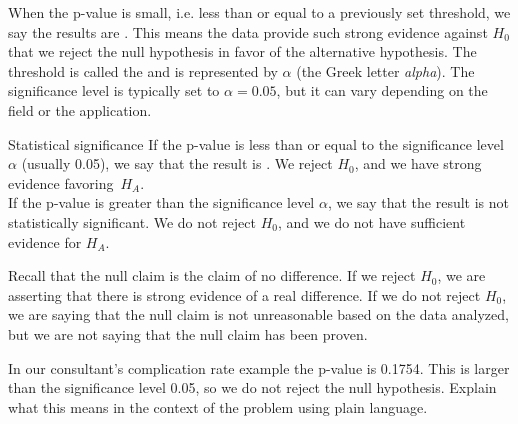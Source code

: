 When the p-value is small, i.e. less than or equal to a previously set threshold, we say the results are . This means the data provide such strong evidence against $H_0$ that we reject the null hypothesis in favor of the alternative hypothesis. The threshold is called the  and is represented by $\alpha$ (the Greek letter \emph{alpha}\label{alphadiscussion}).  The significance level is typically set to $\alpha = 0.05$, but it can vary depending on the field or the application. %

\begin{onebox}{Statistical significance}
If the p-value is less than or equal to the significance level $\alpha$ (usually 0.05), we say that the result is . We reject $H_0$, and we have strong evidence favoring~$H_A$. \\[2mm]
If the p-value is greater than the significance level $\alpha$, we say that the result is not statistically significant. We do not reject $H_0$, and we do not have sufficient evidence for $H_A$.\end{onebox}

Recall that the null claim is the claim of no difference. If we reject $H_0$, we are asserting that there is strong evidence of a real difference. If we do not reject $H_0$, we are saying that the null claim is not unreasonable based on the data analyzed, but we are not saying that the null claim has been proven.

\begin{exercisewrap}
\begin{nexercise} \label{plainLanguageExplanationOfHTConclusionForLiverDonorSurgicalConsultant}
In our consultant's complication rate example the p-value is 0.1754.  This is larger than the significance level 0.05, so we do not reject the null hypothesis. Explain what this means in the context of the problem using plain language.\footnotemark
\end{nexercise}
\end{exercisewrap}

